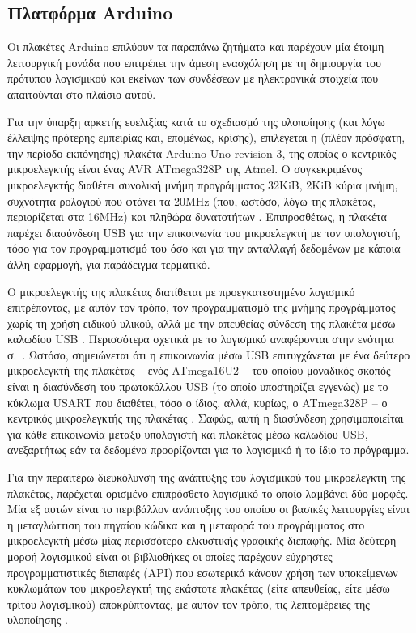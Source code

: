\subsection{Πλατφόρμα Arduino}
\label{subsec:arduino}

Οι πλακέτες Arduino επιλύουν τα παραπάνω ζητήματα και παρέχουν μία έτοιμη
λειτουργική μονάδα που επιτρέπει την άμεση ενασχόληση με τη δημιουργία του
πρότυπου λογισμικού και εκείνων των συνδέσεων με ηλεκτρονικά στοιχεία που
απαιτούνται στο πλαίσιο αυτού.

Για την ύπαρξη αρκετής ευελιξίας κατά το σχεδιασμό της υλοποίησης (και λόγω
έλλειψης πρότερης εμπειρίας και, επομένως, κρίσης), επιλέγεται η (πλέον
πρόσφατη, την περίοδο εκπόνησης) πλακέτα Arduino Uno revision 3, της οποίας ο
κεντρικός μικροελεγκτής είναι ένας AVR ATmega328P της Atmel. Ο συγκεκριμένος
μικροελεγκτής διαθέτει συνολική μνήμη προγράμματος 32KiB, 2KiB κύρια μνήμη,
συχνότητα ρολογιού που φτάνει τα 20MHz (που, ωστόσο, λόγω της πλακέτας,
περιορίζεται στα 16MHz) και πληθώρα δυνατοτήτων
\parencites[1]{atmel13}{arduino:uno}. Επιπροσθέτως, η πλακέτα παρέχει διασύνδεση
USB για την επικοινωνία του μικροελεγκτή με τον υπολογιστή, τόσο για τον
προγραμματισμό του όσο και για την ανταλλαγή δεδομένων με κάποια άλλη εφαρμογή,
για παράδειγμα τερματικό.

Ο μικροελεγκτής της πλακέτας  διατίθεται με
προεγκατεστημένο
λογισμικό  επιτρέποντας, με αυτόν τον τρόπο, τον προγραμματισμό
της μνήμης προγράμματος χωρίς τη χρήση ειδικού υλικού, αλλά με την απευθείας
σύνδεση της πλακέτα μέσω καλωδίου USB \parencite{arduino:environ}. Περισσότερα
σχετικά με το λογισμικό  αναφέρονται στην ενότητα
 σ.~\pageref{subsec:avr:progmem}.
Ωστόσο, σημειώνεται ότι η
επικοινωνία μέσω USB επιτυγχάνεται με ένα δεύτερο μικροελεγκτή της πλακέτας --
ενός ATmega16U2 -- του οποίου μοναδικός σκοπός είναι η διασύνδεση του
πρωτοκόλλου USB (το οποίο υποστηρίζει εγγενώς) με το κύκλωμα USART που διαθέτει,
τόσο ο ίδιος, αλλά, κυρίως, ο ATmega328P -- ο κεντρικός μικροελεγκτής της
πλακέτας \parencites{arduino:uno}[148,185]{atmel12}[172]{atmel13}. Σαφώς, αυτή η
διασύνδεση χρησιμοποιείται για κάθε επικοινωνία μεταξύ υπολογιστή και πλακέτας
μέσω καλωδίου USB, ανεξαρτήτως εάν τα δεδομένα προορίζονται για το λογισμικό
 ή το ίδιο το πρόγραμμα.

Για την περαιτέρω διευκόλυνση της ανάπτυξης του λογισμικού του μικροελεγκτή της
πλακέτας,
παρέχεται ορισμένο επιπρόσθετο λογισμικό  το οποίο λαμβάνει δύο
μορφές. Μία εξ αυτών είναι το περιβάλλον ανάπτυξης  του οποίου
οι βασικές λειτουργίες είναι η μεταγλώττιση του πηγαίου κώδικα και η μεταφορά
του προγράμματος στο μικροελεγκτή \parencite{arduino:environ} μέσω μίας
περισσότερο ελκυστικής γραφικής διεπαφής. Μία δεύτερη μορφή
λογισμικού είναι οι βιβλιοθήκες  οι οποίες παρέχουν εύχρηστες
προγραμματιστικές διεπαφές (API) που εσωτερικά κάνουν χρήση των υποκείμενων
κυκλωμάτων του μικροελεγκτή της εκάστοτε πλακέτας (είτε απευθείας, είτε μέσω
τρίτου λογισμικού) αποκρύπτοντας, με αυτόν τον τρόπο, τις λεπτομέρειες της
υλοποίησης \parencite{arduino:lib}.



